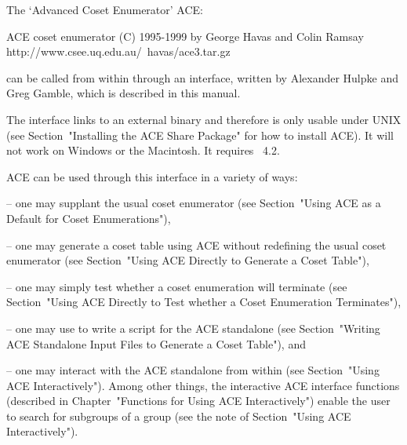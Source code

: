 
\def\ACE{{\sf ACE}}

The \lq{}Advanced Coset Enumerator' {\ACE}:

\begintt
ACE coset enumerator (C) 1995-1999 by George Havas and Colin Ramsay
    http://www.csee.uq.edu.au/~havas/ace3.tar.gz
\endtt

can  be called  from within  {\GAP} through  an interface,  written by
Alexander Hulpke and Greg Gamble, which is described in this manual.

The interface links to an external binary and therefore is only usable
under UNIX (see Section~"Installing the ACE Share Package" for how  to
install {\ACE}).  It will not work  on  Windows  or the Macintosh.  It
requires {\GAP}~4.2.

{\ACE} can be used through this interface in a variety  of  ways:

\beginlist

\item{--} one may supplant the  usual  {\GAP}  coset  enumerator  (see
Section~"Using ACE as a Default for Coset Enumerations"),

\item{--}  one  may  generate  a  coset  table  using  {\ACE}  without
redefining the usual {\GAP} coset enumerator (see  Section~"Using  ACE
Directly to Generate a Coset Table"),

\item{--} one  may  simply  test  whether  a  coset  enumeration  will
terminate (see Section~"Using ACE Directly to  Test  whether  a  Coset
Enumeration Terminates"),

\item{--} one may  use  {\GAP}  to  write  a  script  for  the  {\ACE}
standalone  (see  Section~"Writing  ACE  Standalone  Input  Files   to
Generate a Coset Table"), and

\item{--} one may interact with  the  {\ACE}  standalone  from  within
{\GAP} (see Section~"Using ACE Interactively").  Among  other  things,
the   interactive   {\ACE}   interface   functions    (described    in
Chapter~"Functions for Using ACE Interactively") enable  the  user  to
search for subgroups of a group (see the note  of  Section~"Using  ACE
Interactively").


